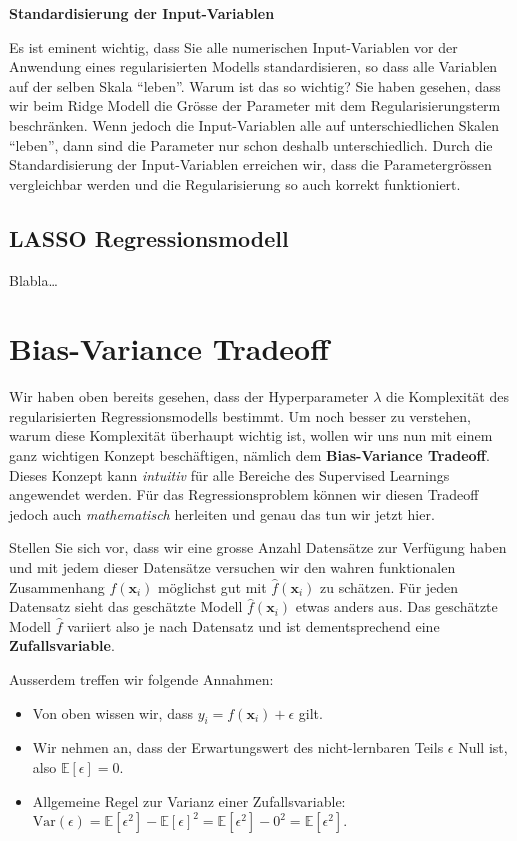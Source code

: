\documentclass[
]{book}
\providecommand{\tightlist}{%
  \setlength{\itemsep}{0pt}\setlength{\parskip}{0pt}}
\begin{document}
\textbf{Standardisierung der Input-Variablen}

Es ist eminent wichtig, dass Sie alle numerischen Input-Variablen vor der Anwendung eines regularisierten Modells standardisieren, so dass alle Variablen auf der selben Skala ``leben''. Warum ist das so wichtig? Sie haben gesehen, dass wir beim Ridge Modell die Grösse der Parameter mit dem Regularisierungsterm beschränken. Wenn jedoch die Input-Variablen alle auf unterschiedlichen Skalen ``leben'', dann sind die Parameter nur schon deshalb unterschiedlich. Durch die Standardisierung der Input-Variablen erreichen wir, dass die Parametergrössen vergleichbar werden und die Regularisierung so auch korrekt funktioniert.

\hypertarget{lasso-regressionsmodell}{%
\subsection{LASSO Regressionsmodell}\label{lasso-regressionsmodell}}

Blabla\ldots{}

\hypertarget{bias-variance-tradeoff}{%
\section{Bias-Variance Tradeoff}\label{bias-variance-tradeoff}}

Wir haben oben bereits gesehen, dass der Hyperparameter \(\lambda\) die Komplexität des regularisierten Regressionsmodells bestimmt. Um noch besser zu verstehen, warum diese Komplexität überhaupt wichtig ist, wollen wir uns nun mit einem ganz wichtigen Konzept beschäftigen, nämlich dem \textbf{Bias-Variance Tradeoff}. Dieses Konzept kann \emph{intuitiv} für alle Bereiche des Supervised Learnings angewendet werden. Für das Regressionsproblem können wir diesen Tradeoff jedoch auch \emph{mathematisch} herleiten und genau das tun wir jetzt hier.

Stellen Sie sich vor, dass wir eine grosse Anzahl Datensätze zur Verfügung haben und mit jedem dieser Datensätze versuchen wir den wahren funktionalen Zusammenhang \(f(\mathbf{x}_i)\) möglichst gut mit \(\hat{f}(\mathbf{x}_i)\) zu schätzen. Für jeden Datensatz sieht das geschätzte Modell \(\hat{f}(\mathbf{x}_i)\) etwas anders aus. Das geschätzte Modell \(\hat{f}\) variiert also je nach Datensatz und ist dementsprechend eine \textbf{Zufallsvariable}.

Ausserdem treffen wir folgende Annahmen:

\begin{itemize}
\tightlist
\item
  Von oben wissen wir, dass \(y_i = f(\mathbf{x}_i) + \epsilon\) gilt.
\item
  Wir nehmen an, dass der Erwartungswert des nicht-lernbaren Teils \(\epsilon\) Null ist, also \(\mathbb{E}[\epsilon]=0\).
\item
  Allgemeine Regel zur Varianz einer Zufallsvariable: \(\text{Var}(\epsilon) = \mathbb{E}[\epsilon^2] - \mathbb{E}[\epsilon]^2 = \mathbb{E}[\epsilon^2] - 0^2 = \mathbb{E}[\epsilon^2]\).
\end{itemize}
\end{document}
